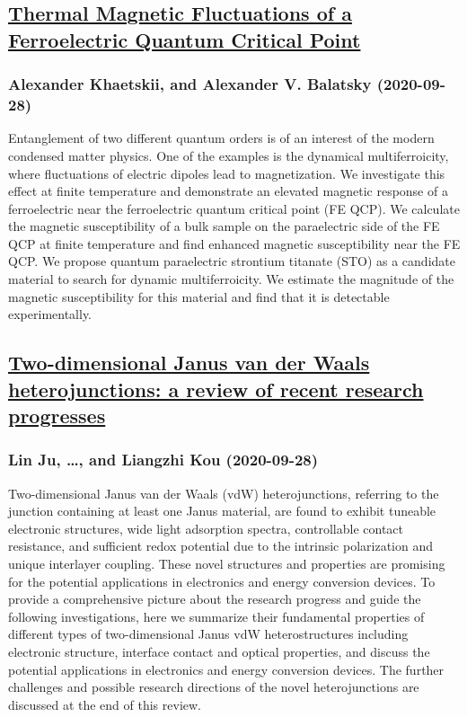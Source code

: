 \subsection*{\href{http://arxiv.org/abs/2009.12995v1}{Thermal Magnetic Fluctuations of a Ferroelectric Quantum Critical Point}}
\subsubsection*{Alexander Khaetskii, and Alexander V. Balatsky (2020-09-28)}
Entanglement of two different quantum orders is of an interest of the modern
condensed matter physics. One of the examples is the dynamical multiferroicity,
where fluctuations of electric dipoles lead to magnetization. We investigate
this effect at finite temperature and demonstrate an elevated magnetic response
of a ferroelectric near the ferroelectric quantum critical point (FE QCP). We
calculate the magnetic susceptibility of a bulk sample on the paraelectric side
of the FE QCP at finite temperature and find enhanced magnetic susceptibility
near the FE QCP. We propose quantum paraelectric strontium titanate (STO) as a
candidate material to search for dynamic multiferroicity. We estimate the
magnitude of the magnetic susceptibility for this material and find that it is
detectable experimentally.

\subsection*{\href{http://arxiv.org/abs/2009.12985v1}{Two-dimensional Janus van der Waals heterojunctions: a review of recent  research progresses}}
\subsubsection*{Lin Ju, \dots, and Liangzhi Kou (2020-09-28)}
Two-dimensional Janus van der Waals (vdW) heterojunctions, referring to the
junction containing at least one Janus material, are found to exhibit tuneable
electronic structures, wide light adsorption spectra, controllable contact
resistance, and sufficient redox potential due to the intrinsic polarization
and unique interlayer coupling. These novel structures and properties are
promising for the potential applications in electronics and energy conversion
devices. To provide a comprehensive picture about the research progress and
guide the following investigations, here we summarize their fundamental
properties of different types of two-dimensional Janus vdW heterostructures
including electronic structure, interface contact and optical properties, and
discuss the potential applications in electronics and energy conversion
devices. The further challenges and possible research directions of the novel
heterojunctions are discussed at the end of this review.

